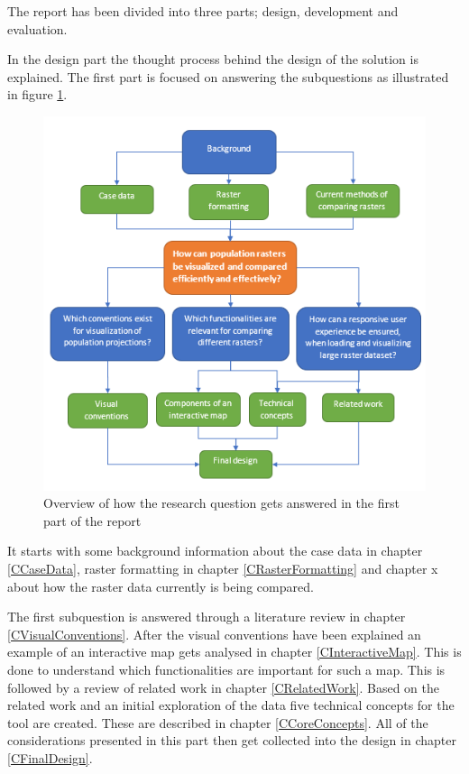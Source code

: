 %
%

The report has been divided into three parts; design, development and evaluation.

In the design part the thought process behind the design of the solution is explained.
The first part is focused on answering the subquestions as illustrated in figure \ref{Structure}. 


\begin{figure} [H]
	\centering
	\includegraphics[width=1\textwidth]{Pictures/ReportStructure}
	\caption{Overview of how the research question gets answered in the first part of the report}
	\label{Structure}
\end{figure}

It starts with some background information about the case data in chapter \ref{CCaseData}, raster formatting in chapter \ref{CRasterFormatting} and chapter x about how the raster data currently is being compared. 

The first subquestion is answered through a literature review in chapter \ref{CVisualConventions}. After the visual conventions have been explained an example of an interactive map gets analysed in chapter \ref{CInteractiveMap}. This is done to understand which functionalities are important for such a map. This is followed by a review of related work in chapter \ref{CRelatedWork}. Based on the related work and an initial exploration of the data five technical concepts for the tool are created. These are described in chapter \ref{CCoreConcepts}. All of the considerations presented in this part then get collected into the design in chapter \ref{CFinalDesign}. 

